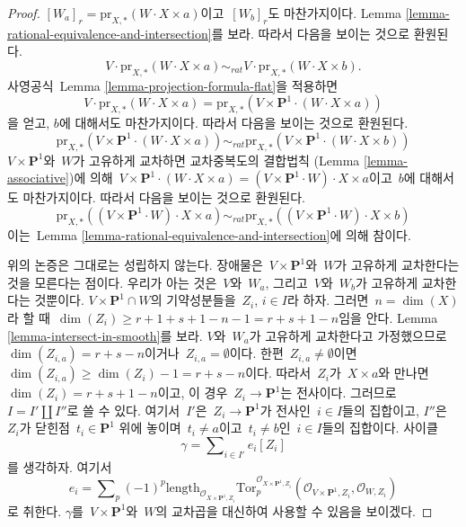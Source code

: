 \begin{proof}
$[W_a]_r = \text{pr}_{X,*}(W \cdot X \times a)$이고\  $[W_b]_r$도
마찬가지이다. Lemma
\ref{lemma-rational-equivalence-and-intersection}를 보라.
따라서 다음을 보이는 것으로 환원된다.
$$
V \cdot \text{pr}_{X,*}( W \cdot X \times a) \sim_{rat} V \cdot
\text{pr}_{X,*}( W \cdot X\times b).
$$
사영공식\  Lemma \ref{lemma-projection-formula-flat}을 적용하면
$$
V \cdot \text{pr}_{X,*}( W \cdot X\times a) =
\text{pr}_{X,*}(V \times \mathbf{P}^1 \cdot (W \cdot X\times a))
$$
을 얻고, $b$에 대해서도 마찬가지이다. 따라서 다음을 보이는 것으로
환원된다.
$$
\text{pr}_{X,*}(V \times \mathbf{P}^1 \cdot (W \cdot X\times a))
\sim_{rat}
\text{pr}_{X,*}(V \times \mathbf{P}^1 \cdot (W \cdot X\times b))
$$
$V \times \mathbf{P}^1$와\  $W$가 고유하게 교차하면 교차중복도의 결합법칙
(Lemma \ref{lemma-associative})에 의해\ 
$V \times \mathbf{P}^1 \cdot (W \cdot X\times a) =
(V \times \mathbf{P}^1 \cdot W) \cdot X \times a$이고\ 
$b$에 대해서도 마찬가지이다. 따라서 다음을 보이는 것으로 환원된다.
$$
\text{pr}_{X,*}((V \times \mathbf{P}^1 \cdot W) \cdot X\times a)
\sim_{rat}
\text{pr}_{X,*}((V \times \mathbf{P}^1 \cdot W) \cdot X\times b)
$$
이는\  Lemma \ref{lemma-rational-equivalence-and-intersection}에 의해
참이다.

\medskip\noindent
위의 논증은 그대로는 성립하지 않는다. 장애물은\ 
$V \times \mathbf{P}^1$와\  $W$가 고유하게 교차한다는 것을 모른다는
점이다. 우리가 아는 것은\  $V$와\  $W_a$, 그리고\  $V$와\  $W_b$가
고유하게 교차한다는 것뿐이다.
$V \times \mathbf{P}^1 \cap W$의 기약성분들을\ 
$Z_i$, $i \in I$라 하자. 그러면\ 
$n = \dim(X)$라 할 때\ 
$\dim(Z_i) \geq r + 1 + s + 1 - n - 1 = r + s + 1 - n$임을 안다.
Lemma \ref{lemma-intersect-in-smooth}를 보라.
$V$와\  $W_a$가 고유하게 교차한다고 가정했으므로\ 
$\dim(Z_{i, a}) = r + s - n$이거나\  $Z_{i, a} = \emptyset$이다.
한편\  $Z_{i, a} \not = \emptyset$이면\ 
$\dim(Z_{i, a}) \geq \dim(Z_i) - 1 = r + s - n$이다.
따라서\  $Z_i$가\  $X \times a$와 만나면\ 
$\dim(Z_i) = r + s + 1 - n$이고, 이 경우\ 
$Z_i \to \mathbf{P}^1$는 전사이다.
그러므로\  $I = I' \amalg I''$로 쓸 수 있다. 여기서\  $I'$은\ 
$Z_i \to \mathbf{P}^1$가 전사인\  $i \in I$들의 집합이고,
$I''$은\  $Z_i$가 닫힌점\  $t_i \in \mathbf{P}^1$ 위에 놓이며\ 
$t_i \not = a$이고\  $t_i \not = b$인\  $i \in I$들의 집합이다.
사이클
$$
\gamma = \sum\nolimits_{i \in I'} e_i [Z_i]
$$
를 생각하자. 여기서
$$
e_i = \sum\nolimits_p (-1)^p
\text{length}_{\mathcal{O}_{X \times \mathbf{P}^1, Z_i}}
\text{Tor}_p^{\mathcal{O}_{X \times \mathbf{P}^1, Z_i}}(
\mathcal{O}_{V \times \mathbf{P}^1, Z_i}, \mathcal{O}_{W, Z_i})
$$
로 취한다. $\gamma$를\  $V \times \mathbf{P}^1$와\  $W$의 교차곱을
대신하여 사용할 수 있음을 보이겠다.


\end{proof}
